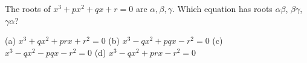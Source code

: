 The roots of $x^3+px^2+qx+r=0$ are $\alpha,\beta,\gamma$. Which equation has roots $\alpha\beta$, $\beta\gamma$, $\gamma\alpha$?

(a) $x^3+qx^2+prx+r^2=0$ \quad (b) $x^3-qx^2+pqx-r^2=0$ \quad (c) $x^3-qx^2-pqx-r^2=0$ \quad (d) $x^3-qx^2+prx-r^2=0$
